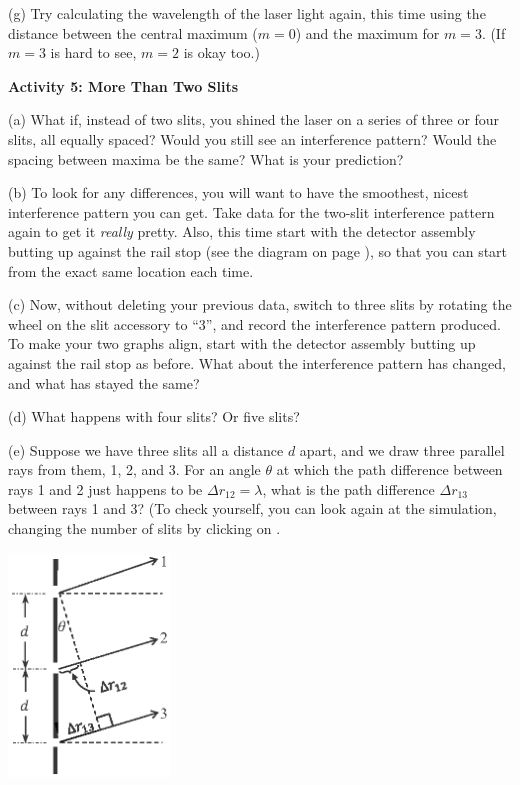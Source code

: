 (g) Try calculating the wavelength of the laser light again, this time using the distance between the central maximum ($m=0$) and the maximum for $m=3$.  (If $m=3$ is hard to see, $m=2$ is okay too.)
\answerspace{0.9in}


\pagebreak[2]
\textbf{Activity 5: More Than Two Slits}

(a) What if, instead of two slits, you shined the laser on a series of three or four slits, all equally spaced?  Would you still see an interference pattern?  Would the spacing between maxima be the same?  What is your prediction?
\answerspace{0.8in}

(b) To look for any differences, you will want to have the smoothest, nicest interference pattern you can get.  Take data for the two-slit interference pattern again to get it \textit{really} pretty.  Also, this time start with the detector assembly butting up against the rail stop (see the diagram on page \pageref{figure_rail_stop}), so that you can start from the exact same location each time.

(c) Now, without deleting your previous data, switch to three slits by rotating the wheel on the slit accessory 
to ``3'', and record the interference pattern produced.
To make your two graphs align, start with the detector assembly butting up against the rail stop as before.  
What about the interference pattern has changed, and what has stayed the same?
\answerspace{0.8in}

(d) What happens with four slits?  Or five slits?
\answerspace{0.8in}

(e) Suppose we have three slits all a distance $d$ apart, and we draw three parallel rays from them, 1, 2, and 3.  For an angle $\theta$ at which the path difference between rays 1 and 2 just happens to be $\Delta r_{12} = \lambda$, what is the path difference $\Delta r_{13}$ between rays 1 and 3?  (To check yourself, you can look again at the simulation, changing the number of slits by clicking on .

\hspace{0.5in}\includegraphics[width=1.7in]{interference_of_light/three_slits.eps}

